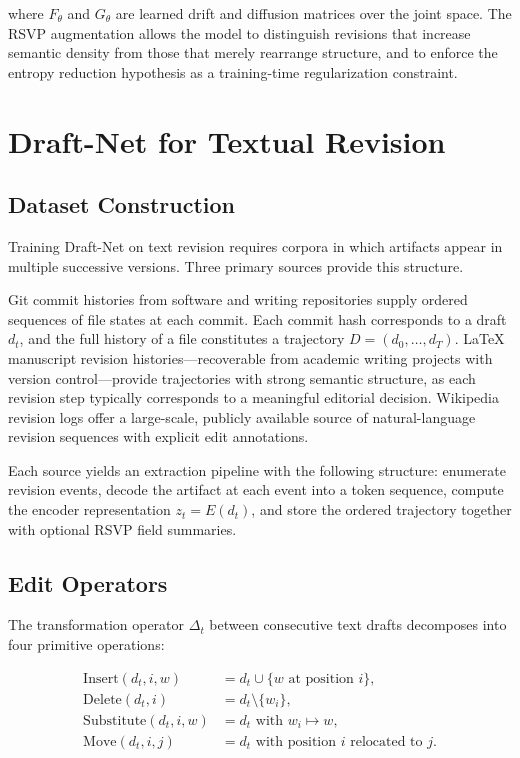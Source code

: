 \documentclass[12pt,a4paper]{article}
\theoremstyle{draftthm}
\newcommand{\enc}{E}
\newcommand{\Ftheta}{F_{\theta}}
\newcommand{\Gtheta}{G_{\theta}}
\begin{document}
where $\Ftheta$ and $\Gtheta$ are learned drift and diffusion matrices over the joint space. The RSVP augmentation allows the model to distinguish revisions that increase semantic density from those that merely rearrange structure, and to enforce the entropy reduction hypothesis as a training-time regularization constraint.

\section{Draft-Net for Textual Revision}

\subsection{Dataset Construction}

Training Draft-Net on text revision requires corpora in which artifacts appear in multiple successive versions. Three primary sources provide this structure.

Git commit histories from software and writing repositories supply ordered sequences of file states at each commit. Each commit hash corresponds to a draft $d_t$, and the full history of a file constitutes a trajectory $D = (d_0, \dots, d_T)$. LaTeX manuscript revision histories---recoverable from academic writing projects with version control---provide trajectories with strong semantic structure, as each revision step typically corresponds to a meaningful editorial decision. Wikipedia revision logs offer a large-scale, publicly available source of natural-language revision sequences with explicit edit annotations.

Each source yields an extraction pipeline with the following structure: enumerate revision events, decode the artifact at each event into a token sequence, compute the encoder representation $z_t = \enc(d_t)$, and store the ordered trajectory together with optional RSVP field summaries.

\subsection{Edit Operators}

The transformation operator $\Delta_t$ between consecutive text drafts decomposes into four primitive operations:

\begin{align}
  \mathrm{Insert}(d_t, i, w) &= d_t \cup \{w \text{ at position } i\}, \\
  \mathrm{Delete}(d_t, i) &= d_t \setminus \{w_i\}, \\
  \mathrm{Substitute}(d_t, i, w) &= d_t \text{ with } w_i \mapsto w, \\
  \mathrm{Move}(d_t, i, j) &= d_t \text{ with position } i \text{ relocated to } j.
\end{align}
\end{document}
